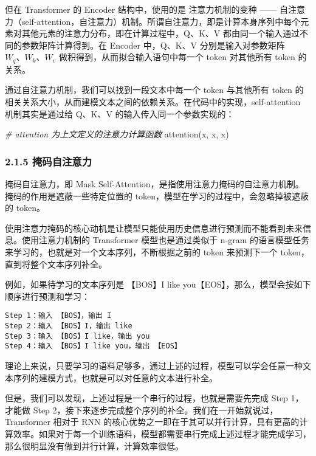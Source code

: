 \documentclass[
]{article}
\newenvironment{Shaded}{}{}
\newcommand{\CommentTok}[1]{\textcolor[rgb]{0.38,0.63,0.69}{\textit{#1}}}
\newcommand{\NormalTok}[1]{#1}
\begin{document}
\hspace{0pt}但在 Transformer 的 Encoder 结构中，使用的是
注意力机制的变种 ------
自注意力（self-attention，自注意力）机制。所谓自注意力，即是计算本身序列中每个元素对其他元素的注意力分布，即在计算过程中，Q、K、V
都由同一个输入通过不同的参数矩阵计算得到。在 Encoder 中，Q、K、V
分别是输入对参数矩阵 \(W_q、W_k、W_v\)
做积得到，从而拟合输入语句中每一个 token 对其他所有 token 的关系。

通过自注意力机制，我们可以找到一段文本中每一个 token 与其他所有 token
的相关关系大小，从而建模文本之间的依赖关系。\hspace{0pt}在代码中的实现，self-attention
机制其实是通过给 Q、K、V 的输入传入同一个参数实现的：

\begin{Shaded}
\begin{Highlighting}[]
\CommentTok{\# attention 为上文定义的注意力计算函数}
\NormalTok{attention(x, x, x)}
\end{Highlighting}
\end{Shaded}

\subsubsection{2.1.5
掩码自注意力}\label{ux63a9ux7801ux81eaux6ce8ux610fux529b}

掩码自注意力，即 Mask
Self-Attention，是指使用注意力掩码的自注意力机制。掩码的作用是遮蔽一些特定位置的
token，模型在学习的过程中，会忽略掉被遮蔽的 token。

使用注意力掩码的核心动机是让模型只能使用历史信息进行预测而不能看到未来信息。使用注意力机制的
Transformer 模型也是通过类似于 n-gram
的语言模型任务来学习的，也就是对一个文本序列，不断根据之前的 token
来预测下一个 token，直到将整个文本序列补全。

例如，如果待学习的文本序列是 【BOS】I like
you【EOS】，那么，模型会按如下顺序进行预测和学习：

\begin{verbatim}
Step 1：输入 【BOS】，输出 I
Step 2：输入 【BOS】I，输出 like
Step 3：输入 【BOS】I like，输出 you
Step 4：输入 【BOS】I like you，输出 【EOS】
\end{verbatim}

理论上来说，只要学习的语料足够多，通过上述的过程，模型可以学会任意一种文本序列的建模方式，也就是可以对任意的文本进行补全。

但是，我们可以发现，上述过程是一个串行的过程，也就是需要先完成 Step
1，才能做 Step
2，接下来逐步完成整个序列的补全。我们在一开始就说过，Transformer 相对于
RNN
的核心优势之一即在于其可以并行计算，具有更高的计算效率。如果对于每一个训练语料，模型都需要串行完成上述过程才能完成学习，那么很明显没有做到并行计算，计算效率很低。
\end{document}
